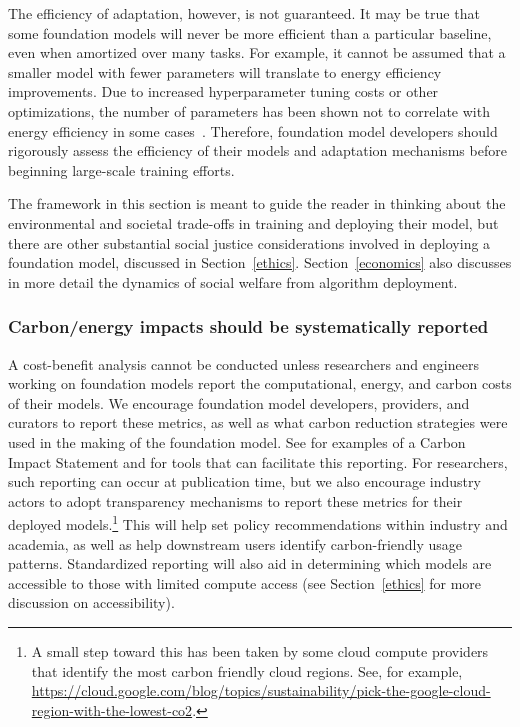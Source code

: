 The efficiency of adaptation, however, is not guaranteed. It may be true that some foundation models will never be more efficient than a particular baseline, even when amortized over many tasks. For example, it cannot be assumed that a smaller model with fewer parameters will translate to energy efficiency improvements. Due to increased hyperparameter tuning costs or other optimizations, the number of parameters has been shown not to correlate with energy efficiency in some cases~\citep{zhou2020hulk,henderson2020towards}. Therefore, foundation model developers should rigorously assess the efficiency of their models and adaptation mechanisms before beginning large-scale training efforts.

The framework in this section is meant to guide the reader in thinking about the environmental and societal trade-offs in training and deploying their model, but there are other substantial social justice considerations involved in deploying a foundation model, discussed in Section~\ref{ethics}.
Section~\ref{economics} also discusses in more detail the dynamics of social welfare from algorithm deployment.

\subsubsection{Carbon/energy impacts should be systematically reported}
\label{sec:environment-reporting}

A cost-benefit analysis cannot be conducted unless researchers and engineers working on foundation models report the computational, energy, and carbon costs of their models. We encourage foundation model developers, providers, and curators to report these metrics, as well as what carbon reduction strategies were used in the making of the foundation model. See \citep{henderson2020towards,lottick2019nergy,lacoste2019quantifying,codecarbon,anthony2020carbontracker} for examples of a Carbon Impact Statement and for tools that can facilitate this reporting. For researchers, such reporting can occur at publication time, but we also encourage industry actors to adopt transparency mechanisms to report these metrics for their deployed models.\footnote{A small step toward this has been taken by some cloud compute providers that identify the most carbon friendly cloud regions. See, for example, \href{https://cloud.google.com/blog/topics/sustainability/pick-the-google-cloud-region-with-the-lowest-co2}{https://cloud.google.com/blog/topics/sustainability/pick-the-google-cloud-region-with-the-lowest-co2}.}
This will help set policy recommendations within industry and academia, as well as help downstream users identify carbon-friendly usage patterns. Standardized reporting will also aid in determining which models are accessible to those with limited compute access (see Section~\ref{ethics} for more discussion on accessibility).


